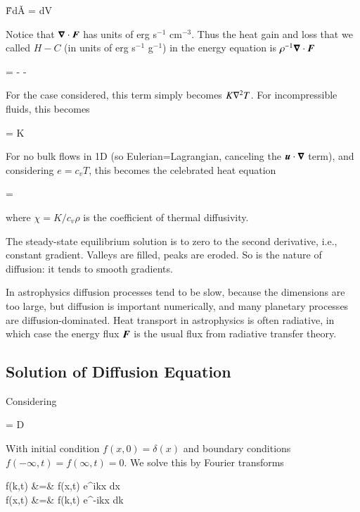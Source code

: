 \beq
\oint \v{F}\cdot d\v{A} = \int  {} dV
\eeq

\noindent Notice that ${\boldsymbol{\nabla}}\cdot{{\boldsymbol{F}}}$ has units of erg s$^{-1}$
cm$^{-3}$. Thus the heat gain and loss that
we called $H-C$ (in units of erg s$^{-1}$ g$^{-1}$) in the energy equation is 
$\rho^{-1}{\boldsymbol{\nabla}}\cdot{{\boldsymbol{F}}}$

\beq
{} = -   -
\eeq

For the case considered, this term simply becomes $K\nabla^2{T}$. For
incompressible fluids, this becomes 

\beq
\rho{} = K
\eeq

For no bulk flows in 1D (so Eulerian=Lagrangian, canceling the
${\boldsymbol{u}}\cdot{\boldsymbol{\nabla}}$ term), and considering $e=c_v T$, this becomes the
celebrated heat equation

\beq
{} = \chi {}
\eeq

\noindent where $\chi = K/c_v \rho$ is the coefficient of thermal
diffusivity.  

The steady-state equilibrium solution is to
zero to the second derivative, i.e., constant gradient. Valleys are
filled, peaks are eroded. So is the nature of diffusion: it tends to
smooth gradients. 

In astrophysics diffusion processes tend to be slow, because the
dimensions are too large, but diffusion is important numerically, and
many planetary processes are diffusion-dominated. Heat transport in
astrophysics is often radiative, in which case the energy flux ${\boldsymbol{F}}$ is
the usual flux from radiative transfer theory. 

\subsection{Solution of Diffusion Equation}

Considering

\beq
{} = D 
\eeq

With initial condition $f(x,0)=\delta(x)$ and boundary conditions
$f(-\infty,t)=f(\infty,t)=0$. We solve this by Fourier transforms

\beqn
f(k,t) &=& \int f(x,t) e^{ikx} dx \label{eq:fourier-kx}\\
f(x,t) &=& \int f(k,t) e^{-ikx} dk \label{eq:fourier-xk}
\eeqn



